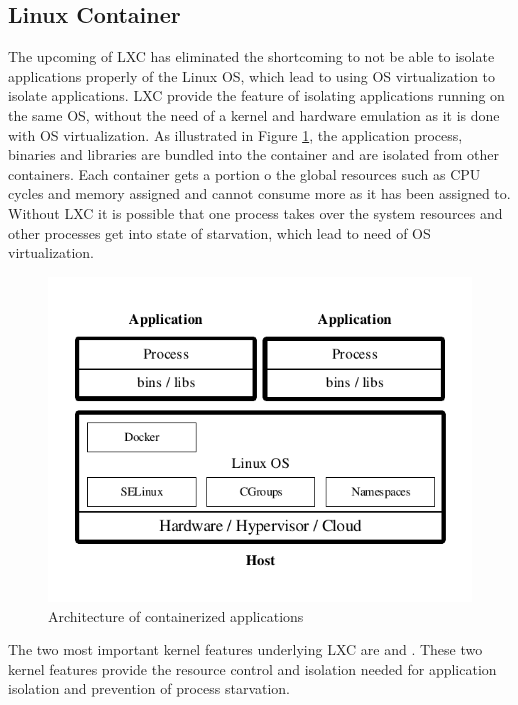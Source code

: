 \subsection{Linux Container}
\label{sec:docker-linux-container}
The upcoming of LXC has eliminated the shortcoming to not be able to isolate applications properly of the Linux OS, which lead to using OS virtualization to isolate applications. LXC provide the feature of isolating applications running on the same OS, without the need of a kernel and hardware emulation as it is done with OS virtualization. As illustrated in Figure \ref{fig:docker-container-architecture}, the application process, binaries and libraries are bundled into the container and are isolated from other containers. Each container gets a portion o the global resources such as CPU cycles and memory assigned and cannot consume more as it has been assigned to. Without LXC it is possible that one process takes over the system resources and other processes get into state of starvation, which lead to need of OS virtualization. 

\begin{figure}[htbp]
	\centering
	\includegraphics[scale=0.8]{images/docker-containerized-architecture.pdf}
	\caption{Architecture of containerized applications}
	\label{fig:docker-container-architecture}
\end{figure} 

The two most important kernel features underlying LXC are  and . These two kernel features provide the resource control and isolation needed for application isolation and prevention of process starvation.

